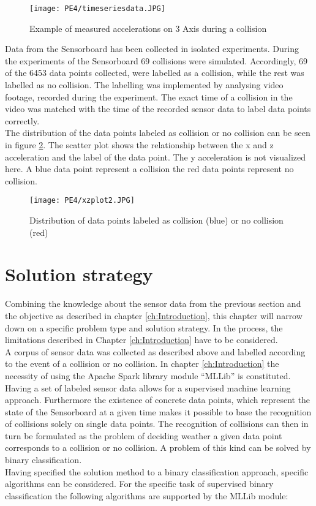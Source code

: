 \begin{figure}[h]
\centering
\texttt{[image: PE4/timeseriesdata.JPG]}
\caption{Example of measured accelerations on 3 Axis during a collision }
\label{fig:timeaxis}
\end{figure}

Data from the Sensorboard has been collected in isolated experiments. During the experiments of the Sensorboard 69 collisions were simulated. Accordingly, 69 of the 6453 data points collected,  were labelled as a collision, while the rest was labelled  as no collision. The labelling was implemented by analysing video footage, recorded during the experiment. The exact time of a collision in the video was matched with the time of the recorded sensor data to label data points correctly.\\
The distribution of the data points labeled as collision or no collision can be seen in figure \ref{fig:xyscatter}. The scatter plot shows the relationship between the x and z acceleration and the label of the data point. The y acceleration is not visualized here. A blue data point represent a collision the red data points represent no collision.

\begin{figure}[h]
\centering
\texttt{[image: PE4/xzplot2.JPG]}
\caption{Distribution of data points labeled as collision (blue) or no collision (red)}
\label{fig:xyscatter}
\end{figure}

\section{Solution strategy}
\label{sec:Solution strategy}
Combining the knowledge about the sensor data from the previous section and the objective as described in chapter \ref{ch:Introduction}, this chapter will narrow down on a specific problem type and solution strategy. In the process, the limitations described in Chapter \ref{ch:Introduction} have to be considered. \\
A corpus of sensor data was collected as described above and labelled according to the event of a collision or no collision. In chapter \ref{ch:Introduction}  the necessity of using the Apache Spark library module ``MLLib'' is constituted.
\\ 
Having a set of labeled sensor data allows for a supervised machine learning approach.  Furthermore the existence of concrete data points, which represent the state of the Sensorboard at a given time makes it possible to base the recognition of collisions solely on single data points. The recognition of collisions can then in turn be formulated as the problem of deciding weather a given data point corresponds to a collision or no collision. A problem of this kind can be solved by binary classification. \\
Having specified the solution method to a binary classification approach, specific algorithms can be considered. For the specific task of supervised binary classification the following algorithms are supported by the MLLib module:

